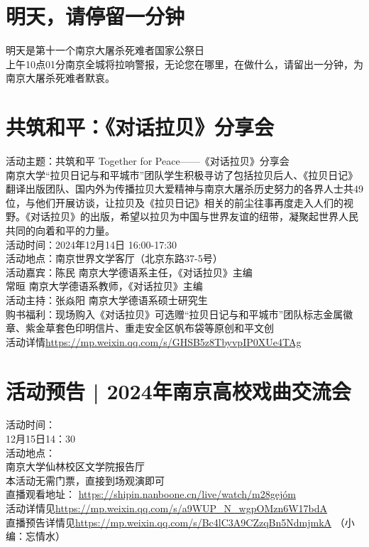 \documentclass[letterpaper, 12pt]{article}
\begin{document}
\begin{multicols}{2}
\section{明天，请停留一分钟}
明天是第十一个南京大屠杀死难者国家公祭日\\
上午10点01分南京全城将拉响警报，无论您在哪里，在做什么，请留出一分钟，为南京大屠杀死难者默哀。

\section{共筑和平：《对话拉贝》分享会}
活动主题：共筑和平 Together for Peace——《对话拉贝》分享会\\
南京大学“拉贝日记与和平城市”团队学生积极寻访了包括拉贝后人、《拉贝日记》翻译出版团队、国内外为传播拉贝大爱精神与南京大屠杀历史努力的各界人士共49位，与他们开展访谈，让拉贝及《拉贝日记》相关的前尘往事再度走入人们的视野。《对话拉贝》的出版，希望以拉贝为中国与世界友谊的纽带，凝聚起世界人民共同的向着和平的力量。\\
活动时间：2024年12月14日 16:00-17:30\\
活动地点：南京世界文学客厅（北京东路37-5号）\\
活动嘉宾：陈民 南京大学德语系主任，《对话拉贝》主编\\
常晅 南京大学德语系教师，《对话拉贝》主编\\
活动主持：张焱阳 南京大学德语系硕士研究生\\
购书福利：现场购入《对话拉贝》可选赠“拉贝日记与和平城市”团队标志金属徽章、紫金草套色印明信片、重走安全区帆布袋等原创和平文创\\
活动详情\url{https://mp.weixin.qq.com/s/GHSB5z8TbyvpIP0XUe4TAg}\\

\section{活动预告 | 2024年南京高校戏曲交流会}
活动时间：\\
12月15日14：30\\
活动地点：\\
南京大学仙林校区文学院报告厅\\
本活动无需门票，直接到场观演即可\\
直播观看地址：
\url{https://shipin.nanboone.cn/live/watch/m28gejóm}\\
活动详情见\url{https://mp.weixin.qq.com/s/a9WUP_N_wgpOMzn6W17bdA}\\
直播预告详情见\url{https://mp.weixin.qq.com/s/Bc4lC3A9CZzqBn5NdmjmkA} （小编：忘情水）


\end{multicols}
\end{document}

